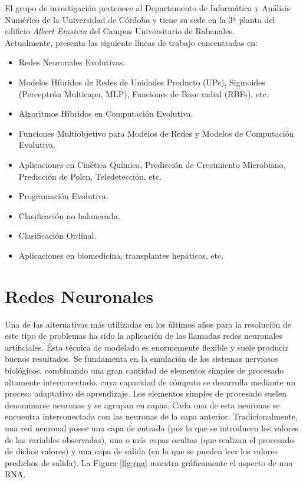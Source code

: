 		El grupo de investigación pertenece al Departamento de Informática y Análisis Numérico de la Universidad de Córdoba y tiene su sede en la 3ª planta del edificio \textit{Albert Einstein} del Campus Universitario de Rabanales.\\
		
		Actualmente, presenta las siguiente líneas de trabajo concentradas en:
		
		\begin{itemize}
			\item Redes Neuronales Evolutivas.
			\item Modelos Híbridos de Redes de Unidades Producto (UPs), Sigmoides (Perceptrón Multicapa, MLP), Funciones de Base radial (RBFs), etc.
			\item Algoritmos Híbridos en Computación Evolutiva.
			\item Funciones Multiobjetivo para Modelos de Redes y Modelos de Computación Evolutiva.
			\item Aplicaciones en Cinética Química, Predicción de Crecimiento Microbiano, Predicción de Polen, Teledetección, etc.
			\item Programación Evolutiva.
			\item Clasificación no balanceada.
			\item Clasificación Ordinal.
			\item Aplicaciones en biomedicina, transplantes hepáticos, etc.
		\end{itemize}
	
	\section{Redes Neuronales}
		
		Una de las alternativas más utilizadas en los últimos años para la resolución de este tipo de problemas ha sido la aplicación de las llamadas redes neuronales artificiales. Ésta técnica de modelado es enormemente flexible y suele producir buenos resultados. Se fundamenta en la emulación de los sistemas nerviosos biológicos, combinando una gran cantidad de elementos simples de procesado altamente interconectado, cuya capacidad de cómputo se desarrolla mediante un proceso adaptativo de aprendizaje. Los elementos simples de procesado suelen denominarse neuronas y se agrupan en capas. Cada una de esta neuronas se encuentra interconectada con las neuronas de la capa anterior. Tradicionalmente, una red neuronal posee una capa de entrada (por la que se introducen los valores de las variables observadas), una o más capas ocultas (que realizan el procesado de dichos valores) y una capa de salida (en la que se pueden leer los valores predichos de salida). La Figura \ref{fig:rna} muestra gráficamente el aspecto de una RNA.\\
		
